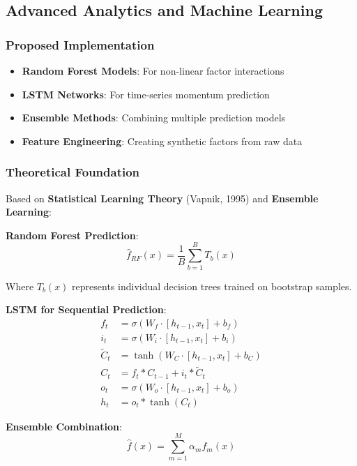 \documentclass[12pt,a4paper]{article}
\begin{document}
\subsection{Advanced Analytics and Machine Learning}

\subsubsection{Proposed Implementation}
\begin{itemize}
    \item \textbf{Random Forest Models}: For non-linear factor interactions
    \item \textbf{LSTM Networks}: For time-series momentum prediction
    \item \textbf{Ensemble Methods}: Combining multiple prediction models
    \item \textbf{Feature Engineering}: Creating synthetic factors from raw data
\end{itemize}

\subsubsection{Theoretical Foundation}
Based on \textbf{Statistical Learning Theory} (Vapnik, 1995) and \textbf{Ensemble Learning}:

\textbf{Random Forest Prediction}:
\begin{equation}
\hat{f}_{RF}(x) = \frac{1}{B} \sum_{b=1}^B T_b(x)
\end{equation}

Where $T_b(x)$ represents individual decision trees trained on bootstrap samples.

\textbf{LSTM for Sequential Prediction}:
\begin{align}
f_t &= \sigma(W_f \cdot [h_{t-1}, x_t] + b_f) \\
i_t &= \sigma(W_i \cdot [h_{t-1}, x_t] + b_i) \\
\tilde{C}_t &= \tanh(W_C \cdot [h_{t-1}, x_t] + b_C) \\
C_t &= f_t * C_{t-1} + i_t * \tilde{C}_t \\
o_t &= \sigma(W_o \cdot [h_{t-1}, x_t] + b_o) \\
h_t &= o_t * \tanh(C_t)
\end{align}

\textbf{Ensemble Combination}:
\begin{equation}
\hat{f}(x) = \sum_{m=1}^M \alpha_m f_m(x)
\end{equation}
\end{document}

